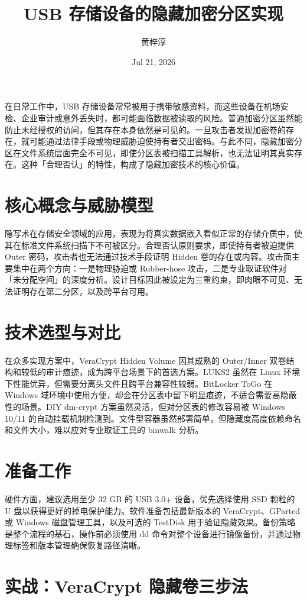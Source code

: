 \title{USB 存储设备的隐藏加密分区实现}
\author{黄梓淳}
\date{Jul 21, 2026}
\maketitle
在日常工作中，USB 存储设备常常被用于携带敏感资料，而这些设备在机场安检、企业审计或意外丢失时，都可能面临数据被读取的风险。普通加密分区虽然能防止未经授权的访问，但其存在本身依然是可见的。一旦攻击者发现加密卷的存在，就可能通过法律手段或物理威胁迫使持有者交出密码。与此不同，隐藏加密分区在文件系统层面完全不可见，即使分区表被扫描工具解析，也无法证明其真实存在。这种「合理否认」的特性，构成了隐藏加密技术的核心价值。\par
\chapter{核心概念与威胁模型}
隐写术在存储安全领域的应用，表现为将真实数据嵌入看似正常的存储介质中，使其在标准文件系统扫描下不可被区分。合理否认原则要求，即使持有者被迫提供 Outer 密码，攻击者也无法通过技术手段证明 Hidden 卷的存在或内容。攻击面主要集中在两个方向：一是物理胁迫或 Rubber-hose 攻击，二是专业取证软件对「未分配空间」的深度分析。设计目标因此被设定为三重约束，即肉眼不可见、无法证明存在第二分区，以及跨平台可用。\par
\chapter{技术选型与对比}
在众多实现方案中，VeraCrypt Hidden Volume 因其成熟的 Outer/Inner 双卷结构和较低的审计痕迹，成为跨平台场景下的首选方案。LUKS2 虽然在 Linux 环境下性能优异，但需要分离头文件且跨平台兼容性较弱。BitLocker ToGo 在 Windows 域环境中使用方便，却会在分区表中留下明显痕迹，不适合需要高隐蔽性的场景。DIY dm-crypt 方案虽然灵活，但对分区表的修改容易被 Windows 10/11 的自动挂载机制检测到。文件型容器虽然部署简单，但隐藏度高度依赖命名和文件大小，难以应对专业取证工具的 binwalk 分析。\par
\chapter{准备工作}
硬件方面，建议选用至少 32 GB 的 USB 3.0+ 设备，优先选择使用 SSD 颗粒的 U 盘以获得更好的掉电保护能力。软件准备包括最新版本的 VeraCrypt、GParted 或 Windows 磁盘管理工具，以及可选的 TestDisk 用于验证隐藏效果。备份策略是整个流程的基石，操作前必须使用 dd 命令对整个设备进行镜像备份，并通过物理标签和版本管理确保恢复路径清晰。\par
\chapter{实战：VeraCrypt 隐藏卷三步法}
